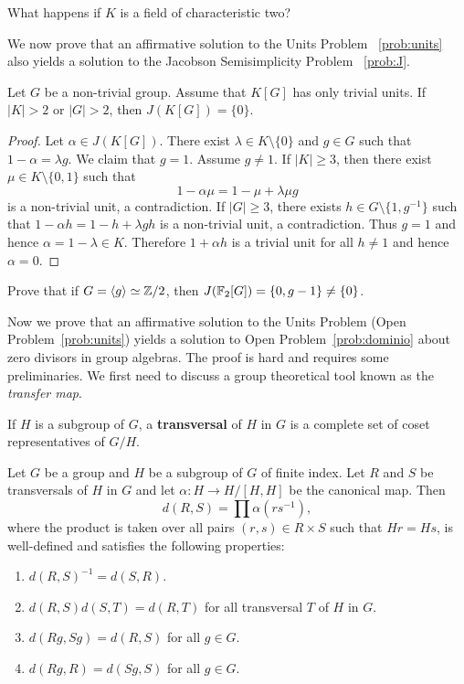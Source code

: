 \begin{exercise}
    What happens if $K$ is a field of characteristic two?
\end{exercise}

We now prove that an affirmative solution to the Units Problem
~\ref{prob:units} also yields a solution to the Jacobson Semisimplicity Problem
~\ref{prob:J}. 

\begin{theorem}
	Let $G$ be a non-trivial group. Assume that $K[G]$ has only trivial units. 
	If $|K|>2$ or $|G|>2$, then $J(K[G])=\{0\}$.
\end{theorem}

\begin{proof}
	Let $\alpha\in J(K[G])$. There exist $\lambda\in K\setminus\{0\}$ and $g\in
	G$ such that $1-\alpha=\lambda g$. We claim that $g=1$. Assume $g\ne 1$. 
	If $|K|\geq3$,
	then there exist $\mu\in K\setminus\{0,1\}$ such that
	\[
		1-\alpha\mu=1-\mu+\lambda\mu g 
	\]
	is a non-trivial unit, a contradiction.
	If $|G|\geq3$, there exists $h\in G\setminus\{1,g^{-1}\}$ such that
	$1-\alpha h=1-h+\lambda gh$ is a non-trivial unit, a contradiction.  Thus
	$g=1$ and hence $\alpha=1-\lambda\in K$. Therefore $1+\alpha h$ is a
	trivial unit for all $h\ne 1$ and hence 	$\alpha=0$.
\end{proof}

\begin{exercise}
	Prove that if $G=\langle g\rangle\simeq\mathbb{Z}/2$, then 
	$J(\mathbb{F}_2[G])=\{0,g-1\}\ne\{0\}$. 
\end{exercise}


Now we prove that an affirmative solution 
to the Units Problem 
(Open Problem~\ref{prob:units}) 
yields a solution to 
Open Problem~\ref{prob:dominio} about zero divisors in group algebras.
The proof is hard and requires some preliminaries. We first need
to discuss a group theoretical tool known as the \emph{transfer map}. 

If $H$ is a subgroup of $G$, a \textbf{transversal} of $H$ in $G$ is a complete
set of coset representatives of $G/H$. 

\begin{lemma}
	\label{lem:d}
	Let $G$ be a group and $H$ be a subgroup of $G$ of finite index.  Let $R$
	and $S$ be transversals of $H$ in $G$ and let $\alpha\colon H\to H/[H,H]$
	be the canonical map. Then 
	\[
		d(R,S)=\prod \alpha(rs^{-1}),
	\]
	where the product is taken over all pairs 
	$(r,s)\in R\times S$ such that $Hr=Hs$,
	is well-defined and satisfies the following properties:
	\begin{enumerate}
		\item $d(R,S)^{-1}=d(S,R)$.
		\item $d(R,S)d(S,T)=d(R,T)$ for all transversal $T$ of $H$ in $G$.
		\item $d(Rg,Sg)=d(R,S)$ for all $g\in G$.
		\item $d(Rg,R)=d(Sg,S)$ for all $g\in G$.
	\end{enumerate}
\end{lemma}

